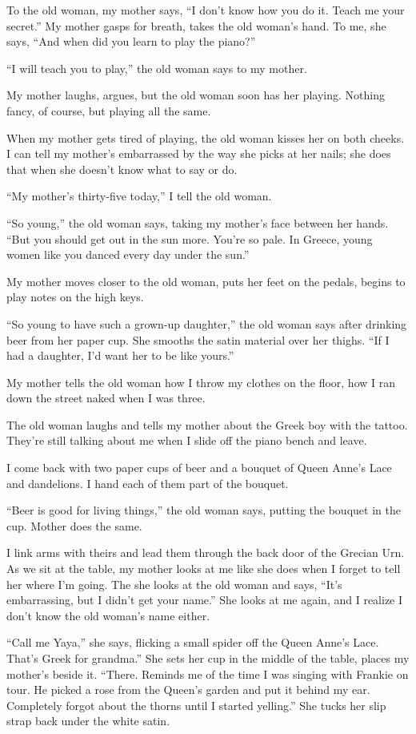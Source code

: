 \documentclass[twoside,10pt]{book}
\begin{document}
To the old woman, my mother says, ``I don't know how you do it. Teach me
your secret.'' My mother gasps for breath, takes the old woman's hand.
To me, she says, ``And when did you learn to play the piano?''

``I will teach you to play,'' the old woman says to my mother.

My mother laughs, argues, but the old woman soon has her playing.
Nothing fancy, of course, but playing all the same.

When my mother gets tired of playing, the old woman kisses her on both
cheeks. I can tell my mother's embarrassed by the way she picks at her
nails; she does that when she doesn't know what to say or do.

``My mother's thirty-five today,'' I tell the old woman.

``So young,'' the old woman says, taking my mother's face between her
hands. ``But you should get out in the sun more. You're so pale. In
Greece, young women like you danced every day under the sun.''

My mother moves closer to the old woman, puts her feet on the pedals,
begins to play notes on the high keys.

``So young to have such a grown-up daughter,'' the old woman says after
drinking beer from her paper cup. She smooths the satin material over
her thighs. ``If I had a daughter, I'd want her to be like yours.''

My mother tells the old woman how I throw my clothes on the floor, how I
ran down the street naked when I was three.

The old woman laughs and tells my mother about the Greek boy with the
tattoo. They're still talking about me when I slide off the piano bench
and leave.

I come back with two paper cups of beer and a bouquet of Queen Anne's
Lace and dandeli­ons. I hand each of them part of the bouquet.

``Beer is good for living things,'' the old woman says, putting the
bouquet in the cup. Mother does the same.

I link arms with theirs and lead them through the back door of the
Grecian Urn. As we sit at the table, my mother looks at me like she does
when I forget to tell her where I'm going. The she looks at the old
woman and says, ``It's embarrassing, but I didn't get your name.'' She
looks at me again, and I realize I don't know the old woman's name
either.

``Call me Yaya,'' she says, flicking a small spider off the Queen Anne's
Lace. That's Greek for grandma.'' She sets her cup in the middle of the
table, places my mother's beside it. ``There. Reminds me of the time I
was singing with Frankie on tour. He picked a rose from the Queen's
garden and put it behind my ear. Completely forgot about the thorns
until I started yelling.'' She tucks her slip strap back under the white
satin.
\end{document}
